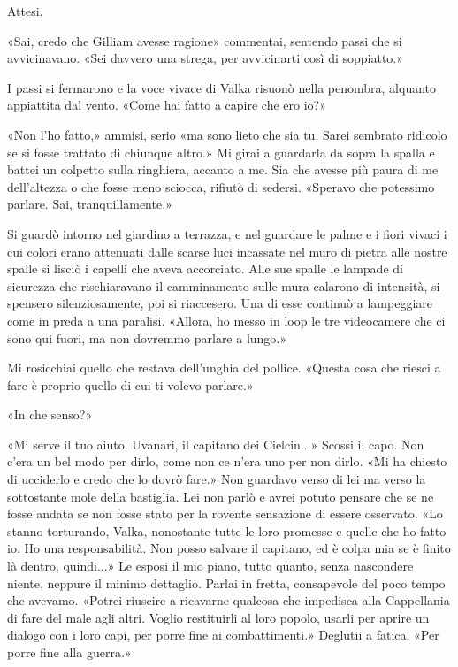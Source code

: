 Attesi.

«Sai, credo che Gilliam avesse ragione» commentai, sentendo passi che si
avvicinavano. «Sei davvero una strega, per avvicinarti così di
soppiatto.»

I passi si fermarono e la voce vivace di Valka risuonò nella penombra,
alquanto appiattita dal vento. «Come hai fatto a capire che ero io?»

«Non l'ho fatto,» ammisi, serio «ma sono lieto che sia tu. Sarei
sembrato ridicolo se si fosse trattato di chiunque altro.» Mi girai a
guardarla da sopra la spalla e battei un colpetto sulla ringhiera,
accanto a me. Sia che avesse più paura di me dell'altezza o che fosse
meno sciocca, rifiutò di sedersi. «Speravo che potessimo parlare. Sai,
tranquillamente.»

Si guardò intorno nel giardino a terrazza, e nel guardare le palme e i
fiori vivaci i cui colori erano attenuati dalle scarse luci incassate
nel muro di pietra alle nostre spalle si lisciò i capelli che aveva
accorciato. Alle sue spalle le lampade di sicurezza che {rischiaravano}
il camminamento sulle mura calarono di intensità, si spensero
silenziosamente, poi si riaccesero. Una di esse continuò a lampeggiare
come in preda a una paralisi. «Allora, ho messo in loop le tre
videocamere che ci sono qui fuori, ma non dovremmo parlare a lungo.»

Mi rosicchiai quello che restava dell'unghia del pollice. «Questa cosa
che riesci a fare è proprio quello di cui ti volevo parlare.»

«In che senso?»

«Mi serve il tuo aiuto. Uvanari, il capitano dei Cielcin...» Scossi il
capo. Non c'era un bel modo per dirlo, come non ce n'era uno per non
dirlo. «Mi ha chiesto di ucciderlo e credo che lo dovrò fare.» Non
guardavo verso di lei ma verso la sottostante mole della bastiglia. Lei
non parlò e avrei potuto pensare che se ne fosse andata se non fosse
stato per la rovente sensazione di essere osservato. «Lo stanno
torturando, Valka, nonostante tutte le loro promesse e quelle che ho
fatto io. Ho una responsabilità. Non posso salvare il capitano, ed è
colpa mia se è finito là dentro, quindi...» Le esposi il mio piano,
tutto quanto, senza nascondere niente, neppure il minimo dettaglio.
Parlai in fretta, consapevole del poco tempo che avevamo. «Potrei
riuscire a ricavarne qualcosa che impedisca alla Cappellania di fare del
male agli altri. Voglio restituirli al loro popolo, usarli per aprire un
dialogo con i loro capi, per porre fine ai combattimenti.» Deglutii a
fatica. «Per porre fine alla guerra.»

